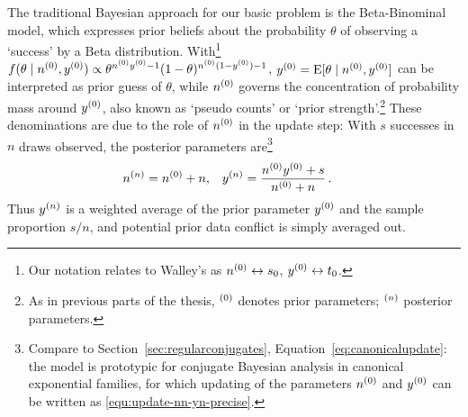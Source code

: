 The traditional Bayesian approach for our basic problem is the Beta-Binominal model, which expresses prior
beliefs about the probability $\theta$ of observing a `success' by a Beta
distribution. With\footnote{Our notation relates to
Walley's \parencite*{1991:walley} as $n^{(0)} \leftrightarrow s_0$, $y^{(0)} \leftrightarrow t_0$.}
$f(\theta\mid n^{(0)}, y^{(0)}) \propto \theta^{n^{(0)}y^{(0)} -1} (1-\theta)^{n^{(0)}(1-y^{(0)})-1}$,
$y^{(0)} = \operatorname{E}[\theta\mid n^{(0)},y^{(0)}]$ can be interpreted as prior guess of
$\theta$, while $n^{(0)}$ governs the concentration of
probability mass around $y^{(0)}$, also known as `pseudo counts' or
`prior strength'.\footnote{As in previous parts of the thesis, ${}^{(0)}$ denotes prior parameters; ${}^{(n)}$ posterior parameters.}
These denominations are due to the
role of $n^{(0)}$ in the update step: With $s$ successes in $n$ draws observed, the
posterior parameters are\footnote{Compare to Section~\ref{sec:regularconjugates},
Equation~\eqref{eq:canonicalupdate}:
the model is prototypic for conjugate Bayesian
analysis in canonical exponential families, for which updating
of the parameters $n^{(0)}$ and $y^{(0)}$ can be
written as \eqref{equ:update-nn-yn-precise}.} %
\begin{align}\label{equ:update-nn-yn-precise}
n^{(n)} &= n^{(0)} + n, & y^{(n)} &= \frac{n^{(0)}y^{(0)} + s}{n^{(0)} + n}\,.
\end{align}
Thus $y^{(n)}$ is a weighted average of the prior parameter $y^{(0)}$ and
the sample proportion $s/n$, and potential prior data conflict is simply averaged out.

